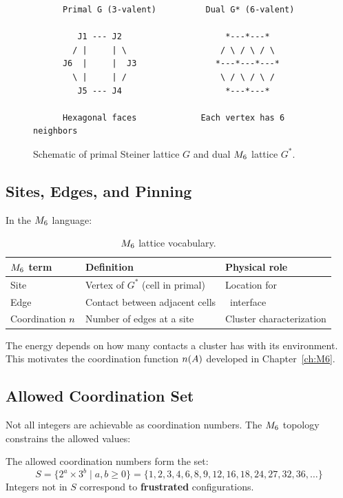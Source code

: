 \begin{figure}[htbp]
\centering
\begin{verbatim}
      Primal G (3-valent)          Dual G* (6-valent)

         J1 --- J2                     *---*---*
        / |     | \                   / \ / \ / \
      J6  |     |  J3                *---*---*---*
        \ |     | /                   \ / \ / \ /
         J5 --- J4                     *---*---*

      Hexagonal faces             Each vertex has 6 neighbors
\end{verbatim}
\caption{Schematic of primal Steiner lattice $G$ and dual $M_6$ lattice $G^*$.}
\label{fig:primal_dual}
\end{figure}

\subsection{Sites, Edges, and Pinning}

In the $M_6$ language:

\begin{table}[htbp]
\centering
\caption{$M_6$ lattice vocabulary.}
\label{tab:M6_vocab}
\begin{tabular}{lll}
    \toprule
    \textbf{$M_6$ term} & \textbf{Definition} & \textbf{Physical role} \\
    \midrule
    Site & Vertex of $G^*$ (cell in primal) & Location for \Pinning \\
    Edge & Contact between adjacent cells & \Pinning\ interface \\
    Coordination $n$ & Number of edges at a site & Cluster characterization \\
    \bottomrule
\end{tabular}
\end{table}

The \textbf{\Pinning} energy depends on how many contacts a cluster has with
its environment. This motivates the coordination function $n(A)$
developed in Chapter~\ref{ch:M6}.

\subsection{Allowed Coordination Set}

Not all integers are achievable as coordination numbers. The $M_6$ topology
constrains the allowed values:

\begin{derivationbox}[title=Allowed Coordination Set]
    The allowed coordination numbers form the set:
    \begin{equation}
        S = \{2^a \times 3^b \mid a, b \geq 0\}
        = \{1, 2, 3, 4, 6, 8, 9, 12, 16, 18, 24, 27, 32, 36, \ldots\}
        \label{eq:ch2:allowed_set}
    \end{equation}
    Integers not in $S$ correspond to \textbf{frustrated} configurations.
    \tagDer
\end{derivationbox}

